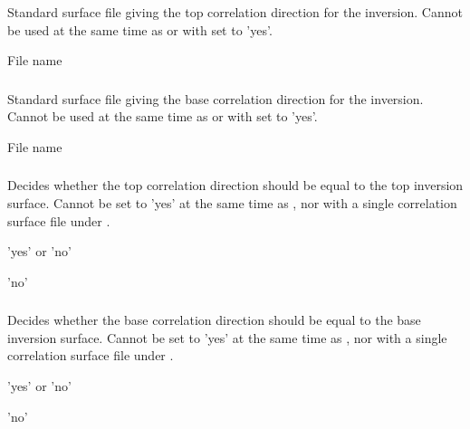 \subsubsection{}
 \slist
   \item \Description Standard surface file giving the top correlation direction for the inversion. Cannot be used at the same time as  or with  set to 'yes'.
   \item \Argument File name
   \item \Default
 \elist

\subsubsection{}
 \slist
   \item \Description Standard surface file giving the base correlation direction for the inversion. Cannot be used at the same time as  or with  set to 'yes'.
   \item \Argument File name
   \item \Default
 \elist
 
\subsubsection{}
 \slist
   \item \Description Decides whether the top correlation direction should be equal to the top inversion surface. Cannot be set to 'yes' at the same time as , nor with a single correlation surface file under .
   \item \Argument 'yes' or 'no'
   \item \Default 'no'
 \elist

\subsubsection{}
 \slist
   \item \Description Decides whether the base correlation direction should be equal to the base inversion surface. Cannot be set to 'yes' at the same time as , nor with a single correlation surface file under .
   \item \Argument 'yes' or 'no'
   \item \Default 'no'
 \elist
 
